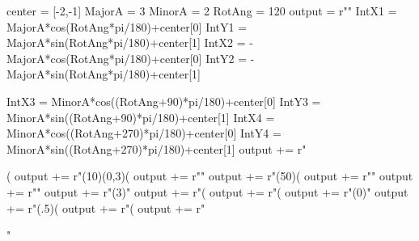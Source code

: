 \documentclass{article}
\begin{document}
\begin{sagesilent}
center = [-2,-1]
MajorA = 3
MinorA = 2
RotAng = 120
output = r""
IntX1 = MajorA*cos(RotAng*pi/180)+center[0]
IntY1 = MajorA*sin(RotAng*pi/180)+center[1]
IntX2 = -MajorA*cos(RotAng*pi/180)+center[0]
IntY2 = -MajorA*sin(RotAng*pi/180)+center[1]

IntX3 = MinorA*cos((RotAng+90)*pi/180)+center[0]
IntY3 = MinorA*sin((RotAng+90)*pi/180)+center[1]
IntX4 = MinorA*cos((RotAng+270)*pi/180)+center[0]
IntY4 = MinorA*sin((RotAng+270)*pi/180)+center[1]
output += r"\begin{lapdf}(%
output += r"\Lingrid(10)(0,3)(%
output += r"\Red"
output += r"\Ellipse(50)(%
output += r"\Stroke"
output += r"\Blue"
output += r"\Dash(3)"
output += r"\Line(%
output += r"\Line(%
output += r"\Dash(0)"
output += r"\Point(.5)(%
output += r"\Text(%
output += r"\end{lapdf}"
\end{sagesilent}
\begin{center}
\end{center}
\end{document}
